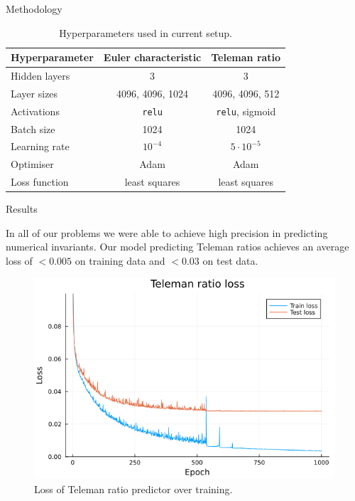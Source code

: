 \documentclass[final,20pt]{beamer}
\newlength{\colwidth}
\begin{document}
\begin{frame}[t, fragile]
\begin{columns}[t]
\begin{column}{\colwidth}
\begin{block}{Methodology}
    \begin{table}
      \centering
      \begin{tabular}{lcc}
        \toprule
        Hyperparameter & Euler characteristic & Teleman ratio\\
        \midrule
        Hidden layers             & 3                   & 3\\
        Layer sizes               & 4096, 4096, 1024    & 4096, 4096, 512\\
        Activations               & {\tt{relu}}         & {\tt{relu}}, sigmoid\\
        Batch size                & 1024                & 1024\\
        Learning rate             & $10^{-4}$           & $5 \cdot 10^{-5}$\\
        Optimiser                 & Adam                & Adam\\
        Loss function             & least squares       & least squares\\
        \bottomrule
      \end{tabular}
      \caption{Hyperparameters used in current setup.}
    \end{table}
  \end{block}

  \begin{block}{Results}

    In all of our problems we were able to achieve high precision in predicting
    numerical invariants.
    Our model predicting Teleman ratios achieves an average loss of
    $<0.005$ on training data and $<0.03$ on test data.

    \begin{figure}
    \includegraphics{teleman-ratio-loss.png}
    \caption{Loss of Teleman ratio predictor over training.}
    \end{figure}
  \end{block}


\end{column}
\end{columns}
\end{frame}
\end{document}
